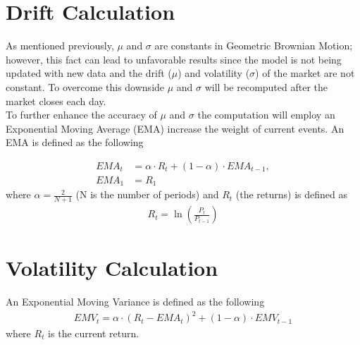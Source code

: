 \documentclass{article}
\begin{document}
\section{Drift Calculation}
As mentioned previously, $\mu$ and $\sigma$ are constants in Geometric Brownian Motion; however, this fact can lead to unfavorable results since the model is not being updated with new data and the drift ($\mu$) and volatility ($\sigma$) of the market are not constant. To overcome this downside $\mu$ and $\sigma$ will be recomputed after the market closes each day.\\
\noindent
To further enhance the accuracy of $\mu$ and $\sigma$ the computation will employ an Exponential Moving Average (EMA) increase the weight of current events. An EMA is defined as the following

\begin{align}
	EMA_t &= \alpha \cdot R_t + (1 - \alpha) \cdot EMA_{t-1},\\
	EMA_1 &= R_1
\end{align}
 where $\alpha  = \frac{2}{N + 1}$ (N is the number of periods) and $R_t$ (the returns) is defined as 
\begin{align}
  R_t = \ln\left(\frac{P_t}{P_{t-1}}\right)
\end{align}

\section{Volatility Calculation}
An Exponential Moving Variance is defined as the following
\begin{align}
	EMV_t = \alpha \cdot \left( R_t - EMA_t \right)^2 + (1 - \alpha) \cdot EMV_{t-1}
\end{align}
where $R_t$ is the current return.








\end{document}
